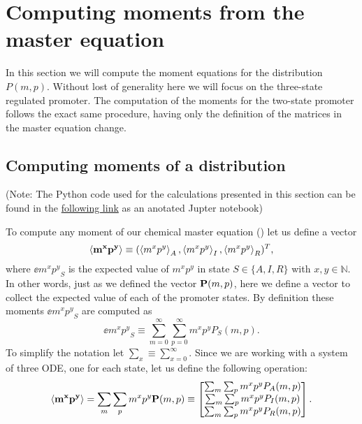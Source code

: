 \section{Computing moments from the master equation}\label{supp_moments}

In this section we will compute the moment equations for the distribution  $P(m,
p)$. Without lost of generality here we will focus on the three-state
regulated promoter. The computation of the moments for the two-state promoter
follows the exact same procedure, having only the definition of the matrices in
the master equation change.

\subsection{Computing moments of a distribution}

(Note: The Python code used for the calculations presented in this section can
be found in the
\href{https://www.rpgroup.caltech.edu//chann_cap/software/moment_dynamics_system.html}{following
link} as an anotated Jupter notebook)

To compute any moment of our chemical master equation ()
let us define a vector
\begin{equation}
  \left\langle \mathbf{m^x p^y} \right\rangle \equiv (\left\langle m^x p^y \right\rangle_A, \left\langle m^x p^y \right\rangle_I, \left\langle m^x p^y \right\rangle_R)^T,
\end{equation}
where $\ee{m^x p^y}_S$ is the expected value of $m^x p^y$ in state $S \in \{A,
I, R\}$ with $x, y \in \mathbb{N}$. In other words, just as we defined the
vector $\mathbf{P}(m, p)$, here we define a vector to collect the expected value of
each of the promoter states. By definition these moments $\ee{m^x p^y}_S$ are
computed as
\begin{equation}
  \ee{m^x p^y}_S \equiv \sum_{m=0}^\infty \sum_{p=0}^\infty m^x p^y P_S(m, p).
  \label{seq_mom_def}
\end{equation}
To simplify the notation let $\sum_x \equiv \sum_{x=0}^\infty$. Since we are
working with a system of three ODE, one for each state, let us define the
following operation:
\begin{equation}
  \left\langle \mathbf{m^x p^y} \right\rangle =
  \sum_m \sum_p m^x p^y \mathbf{P}(m, p) \equiv
  \begin{bmatrix}
    \sum_m \sum_p m^x p^y P_A(m, p)\\
    \sum_m \sum_p m^x p^y P_I(m, p)\\
    \sum_m \sum_p m^x p^y P_R(m, p)\\
  \end{bmatrix}.
\end{equation}

